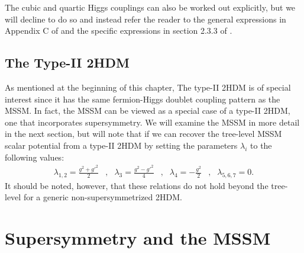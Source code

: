 The cubic and quartic Higgs couplings can also be worked out explicitly, but we will decline to do so and instead refer the reader to the general expressions in Appendix C of  \citep{Branco2012} and the specific expressions in section 2.3.3 of \citep{Kling2016a}. 

\subsection{The Type-II 2HDM}

As mentioned at the beginning of this chapter, The type-II 2HDM is of special interest since it has the same fermion-Higgs doublet coupling pattern as the MSSM. In fact, the MSSM can be viewed as a special case of a type-II 2HDM, one that incorporates supersymmetry. We will examine the MSSM in more detail in the next section, but will note that if we can recover the tree-level MSSM scalar potential from a type-II 2HDM by setting the parameters $\lambda_i$ to the following values:
\begin{align}
\lambda_{1,2} = \frac{g^2+g'^2}{2} &,& \lambda_3 = \frac{g^2-g'^2}{4} &,& \lambda_4 = -\frac{g^2}{2}&,&\lambda_{5,6,7} = 0.
\end{align}
It should be noted, however, that these relations do not hold beyond the tree-level for a generic non-supersymmetrized 2HDM.

\section{Supersymmetry and the MSSM}\label{sec:supersymmetry}

